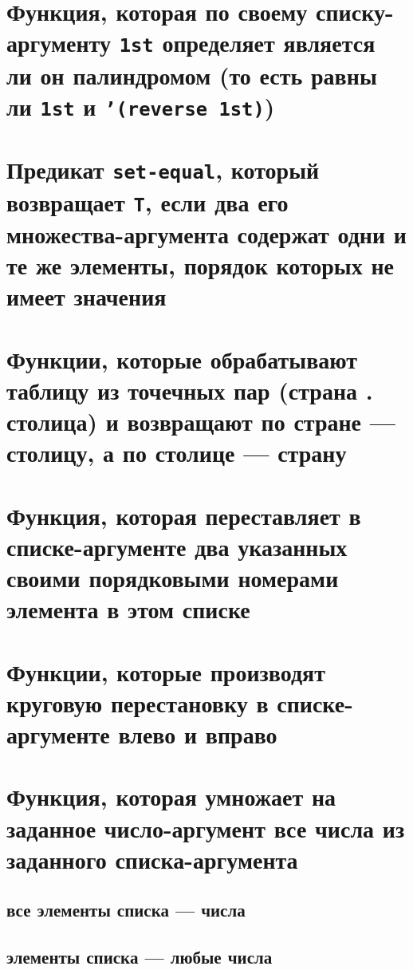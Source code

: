
\section{Функция, которая по своему списку-аргументу \texttt{1st} определяет является ли он палиндромом (то есть равны ли \texttt{1st} и \texttt{'(reverse 1st)})}



\section{Предикат \texttt{set-equal}, который возвращает \texttt{T}, если два его множества-аргумента содержат одни и те же элементы, порядок которых не имеет значения}



\section{Функции, которые обрабатывают таблицу из точечных пар (страна . столица) и возвращают по стране --- столицу, а по столице --- страну}



\section{Функция, которая переставляет в списке-аргументе два указанных своими порядковыми номерами элемента в этом списке}



\section{Функции, которые производят круговую перестановку в списке-аргументе влево и вправо}



\section{Функция, которая умножает на заданное число-аргумент все числа из заданного списка-аргумента}


\subsection{все элементы списка --- числа}


\subsection{элементы списка --- любые числа}